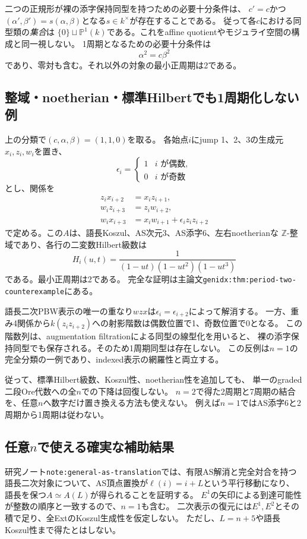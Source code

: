 \documentclass[11pt,a4paper]{ltjsarticle}
\begin{document}
二つの正規形が裸の添字保持同型を持つための必要十分条件は、
$c'=c$かつ$(\alpha',\beta')=s(\alpha,\beta)$となる$s\in k^\times$が存在することである。
従って各$c$における同型類の\emph{集合}は
$\{0\}\sqcup\mathbb P^1(k)$である。これをaffine quotientやモジュライ空間の構成と同一視しない。
1周期となるための必要十分条件は
\[
\alpha^2=c\beta^2
\]
であり、零対も含む。それ以外の対象の最小正周期は2である。

\subsection{整域・noetherian・標準Hilbertでも1周期化しない例}
上の分類で$(c,\alpha,\beta)=(1,1,0)$を取る。
各始点$i$にjump 1、2、3の生成元$x_i,z_i,w_i$を置き、
\[
\epsilon_i=\begin{cases}1&i\text{ が偶数},\\0&i\text{ が奇数}\end{cases}
\]
とし、関係を
\begin{align*}
z_i x_{i+2}&=x_i z_{i+1},\\
w_i z_{i+3}&=z_i w_{i+2},\\
w_i x_{i+3}&=x_iw_{i+1}+\epsilon_i z_i z_{i+2}
\end{align*}
で定める。この$A$は、語長Koszul、AS次元3、AS添字6、左右noetherianな
$\mathbb Z$-整域であり、各行の二変数Hilbert級数は
\[
H_i(u,t)=\frac{1}{(1-ut)(1-ut^2)(1-ut^3)}
\]
である。最小正周期は2である。
完全な証明は主論文\texttt{genidx:thm:period-two-counterexample}にある。

語長二次PBW表示の唯一の重なり$wzx$は$\epsilon_i=\epsilon_{i+2}$によって解消する。
一方、重み4関係から$k(z_i z_{i+2})$への射影階数は偶数位置で1、奇数位置で0となる。
この階数列は、augmentation filtrationによる同型の線型化を用いると、
裸の添字保持同型でも保存される。そのため1周期同型は存在しない。
この反例は$n=1$の完全分類の一例であり、indexed表示の網羅性と両立する。

従って、標準Hilbert級数、Koszul性、noetherian性を追加しても、
単一のgraded二段Ore代数への全$n$での下降は回復しない。
$n=2$で得た2周期と7周期の結合を、任意$n$へ数字だけ置き換える方法も使えない。
例えば$n=1$ではAS添字6と2周期から1周期は従わない。

\subsection{任意\texorpdfstring{$n$}{n}で使える確実な補助結果}
研究ノート\texttt{note:general-as-translation}では、有限AS解消と完全対合を持つ
語長二次対象について、AS頂点置換が$\ell(i)=i+L$という平行移動になり、
語長を保つ$A\simeq A(L)$が得られることを証明する。
$E^1$の矢印による到達可能性が整数の順序と一致するので、$n=1$も含む。
二次表示の復元には$E^1,E^2$とその積で足り、全ExtのKoszul生成性を仮定しない。
ただし、$L=n+5$や語長Koszul性まで得たとはしない。
\end{document}
